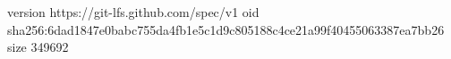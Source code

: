 version https://git-lfs.github.com/spec/v1
oid sha256:6dad1847e0babc755da4fb1e5c1d9c805188c4ce21a99f40455063387ea7bb26
size 349692

